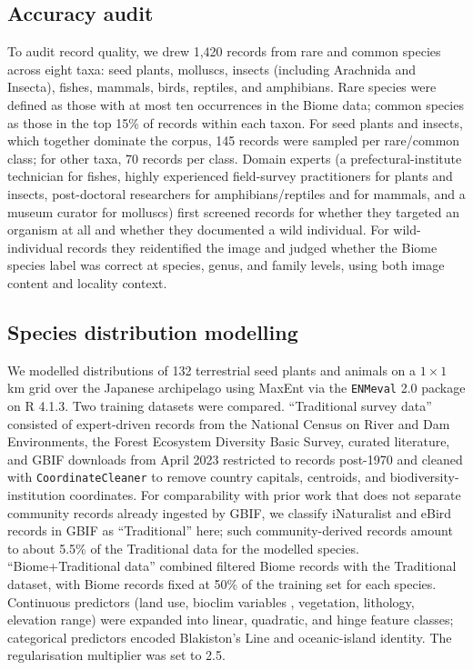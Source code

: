\documentclass[11pt]{article}
\begin{document}
\subsection{Accuracy audit}

To audit record quality, we drew 1{,}420 records from rare and common species across eight taxa: seed plants, molluscs, insects (including Arachnida and Insecta), fishes, mammals, birds, reptiles, and amphibians. Rare species were defined as those with at most ten occurrences in the Biome data; common species as those in the top 15\% of records within each taxon. For seed plants and insects, which together dominate the corpus, 145 records were sampled per rare/common class; for other taxa, 70 records per class. Domain experts (a prefectural-institute technician for fishes, highly experienced field-survey practitioners for plants and insects, post-doctoral researchers for amphibians/reptiles and for mammals, and a museum curator for molluscs) first screened records for whether they targeted an organism at all and whether they documented a wild individual. For wild-individual records they reidentified the image and judged whether the Biome species label was correct at species, genus, and family levels, using both image content and locality context.

\subsection{Species distribution modelling}

We modelled distributions of 132 terrestrial seed plants and animals on a $1 \times 1$ km grid over the Japanese archipelago using MaxEnt \citep{phillips2006maxent,phillips2008maxentextensions,elith2011statistical} via the \texttt{ENMeval} 2.0 package \citep{kass2021enmeval} on R 4.1.3. Two training datasets were compared. ``Traditional survey data'' consisted of expert-driven records from the National Census on River and Dam Environments, the Forest Ecosystem Diversity Basic Survey, curated literature, and GBIF downloads from April 2023 restricted to records post-1970 and cleaned with \texttt{CoordinateCleaner} to remove country capitals, centroids, and biodiversity-institution coordinates. For comparability with prior work that does not separate community records already ingested by GBIF, we classify iNaturalist and eBird records in GBIF as ``Traditional'' here; such community-derived records amount to about 5.5\% of the Traditional data for the modelled species. ``Biome+Traditional data'' combined filtered Biome records with the Traditional dataset, with Biome records fixed at 50\% of the training set for each species. Continuous predictors (land use, bioclim variables \citep{booth2014bioclim}, vegetation, lithology, elevation range) were expanded into linear, quadratic, and hinge feature classes; categorical predictors encoded Blakiston's Line and oceanic-island identity. The regularisation multiplier was set to 2.5.
\end{document}
